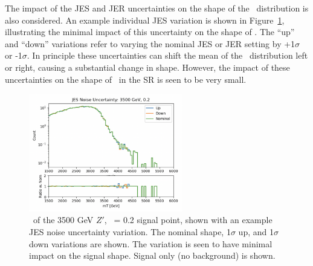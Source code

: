 The impact of the JES and JER uncertainties on the shape of the \mt~distribution is also considered.
An example individual JES variation is shown in Figure~\ref{fig:jes_uncert}, illustrating the minimal impact of this uncertainty on the shape of \mt.
The ``up'' and ``down'' variations refer to varying the nominal JES or JER setting by +1$\sigma$ or -1$\sigma$.
In principle these uncertainties can shift the mean of the \mt~distribution left or right, causing a substantial change in shape.
However, the impact of these uncertainties on the shape of \mt~in the SR is seen to be very small.
\begin{figure}[!htbp]
\centering
   \includegraphics[width=0.6\textwidth]{figures/results/jes}
    \caption{\mt~of the 3500 GeV $Z'$, \rinv~= 0.2 signal point, shown with an example JES noise uncertainty variation. The nominal shape, 1$\sigma$ up, and 1$\sigma$ down variations are shown. The variation is seen to have minimal impact on the signal shape. Signal only (no background) is shown. 
    \label{fig:jes_uncert}}
\end{figure}

